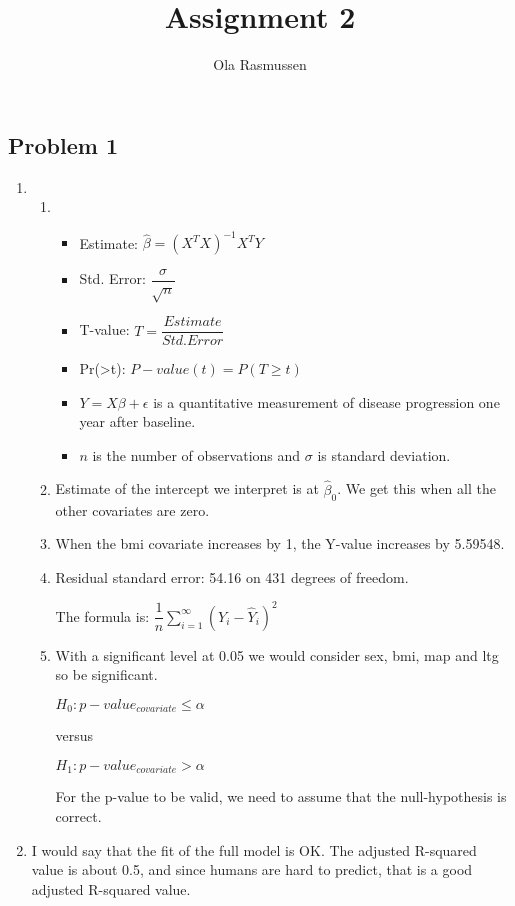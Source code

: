 \documentclass[
]{article}
\title{Assignment 2}
\author{Ola Rasmussen}
\date{}
\providecommand{\tightlist}{%
  \setlength{\itemsep}{0pt}\setlength{\parskip}{0pt}}
\begin{document}
\maketitle

\hypertarget{problem-1}{%
\subsection{Problem 1}\label{problem-1}}

\begin{enumerate}
\def\labelenumi{\alph{enumi}.}
\item
  \begin{enumerate}
  \def\labelenumii{\arabic{enumii}.}
  \item
    \begin{itemize}
    \tightlist
    \item
      Estimate: \(\hat\beta = (X^TX)^{-1}X^TY\)
    \item
      Std. Error: \(\dfrac{\sigma}{\sqrt{n}}\)
    \item
      T-value: \(T = \dfrac{Estimate}{Std. Error}\)
    \item
      Pr(\textgreater\textbar t\textbar): \(P-value(t)=P(T\geq t)\)
    \item
      \(Y = X\beta+\epsilon\) is a quantitative measurement of disease
      progression one year after baseline.
    \item
      \(n\) is the number of observations and \(\sigma\) is standard
      deviation.
    \end{itemize}
  \item
    Estimate of the intercept we interpret is at \(\hat\beta_0\). We get
    this when all the other covariates are zero.
  \item
    When the bmi covariate increases by 1, the Y-value increases by
    5.59548.
  \item
    Residual standard error: 54.16 on 431 degrees of freedom.

    The formula is: \(\dfrac{1}{n}\sum_{i=1}^\infty(Y_i - \hat Y_i)^2\)
  \item
    With a significant level at 0.05 we would consider sex, bmi, map and
    ltg so be significant.

    \(H_0: p-value_{covariate}\leq\alpha\)

    versus

    \(H_1: p-value_{covariate}>\alpha\)

    For the p-value to be valid, we need to assume that the
    null-hypothesis is correct.
  \end{enumerate}
\item
  I would say that the fit of the full model is OK. The adjusted
  R-squared value is about 0.5, and since humans are hard to predict,
  that is a good adjusted R-squared value.


\end{enumerate}
\end{document}
